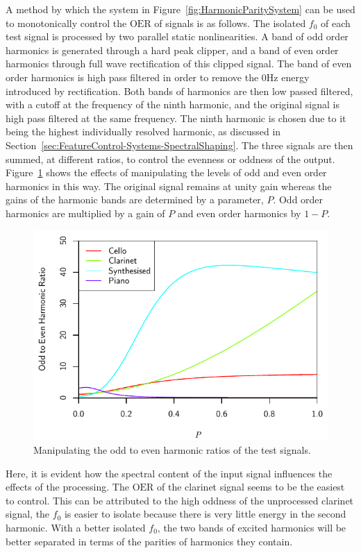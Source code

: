		A method by which the system in Figure~\ref{fig:HarmonicParitySystem} can be used to monotonically control
		the $\mathrm{OER}$ of signals is as follows. The isolated $f_{0}$ of each test signal is processed by two
		parallel static nonlinearities. A band of odd order harmonics is generated through a hard peak clipper, and
		a band of even order harmonics through full wave rectification of this clipped signal. The band of even
		order harmonics is high pass filtered in order to remove the 0Hz energy introduced by rectification.  Both
		bands of harmonics are then low passed filtered, with a cutoff at the frequency of the ninth harmonic, and
		the original signal is high pass filtered at the same frequency. The ninth harmonic is chosen due to it
		being the highest individually resolved harmonic, as discussed in
		Section~\ref{sec:FeatureControl-Systems-SpectralShaping}. The three signals are then summed, at different
		ratios, to control the evenness or oddness of the output.  Figure~\ref{fig:MoveParities} shows the effects
		of manipulating the levels of odd and even order harmonics in this way. The original signal remains at
		unity gain whereas the gains of the harmonic bands are determined by a parameter, $P$.  Odd order harmonics
		are multiplied by a gain of $P$ and even order harmonics by $1 - P$.

		\begin{figure}[h!]
			\centering
			\includegraphics{chapter6/Images/MoveParities.pdf}
			\caption{Manipulating the odd to even harmonic ratios of the test signals.}
			\label{fig:MoveParities}
		\end{figure}

		Here, it is evident how the spectral content of the input signal influences the effects of the processing.
		The $\mathrm{OER}$ of the clarinet signal seems to be the easiest to control. This can be attributed to the
		high oddness of the unprocessed clarinet signal, the $f_{0}$ is easier to isolate because there is very
		little energy in the second harmonic. With a better isolated $f_{0}$, the two bands of excited harmonics
		will be better separated in terms of the parities of harmonics they contain.

